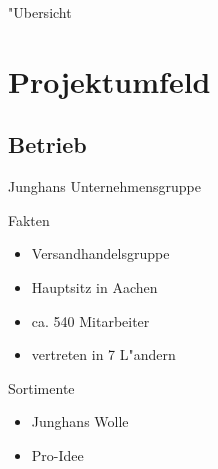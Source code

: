 \AtBeginSection{\frame{\sectionpage}}

\date{\today}

\frenchspacing



\setcounter{framenumber}{0} 
\begin{frame}
  \maketitle
\end{frame}

\setcounter{figure}{0}

\begin{frame}{"Ubersicht}
  \tableofcontents
\end{frame}

\section{Projektumfeld}

\subsection{Betrieb}
\begin{frame}[<+->]{Junghans Unternehmensgruppe}
			\begin{block}{Fakten}
				\begin{itemize}[<+->]
						\item Versandhandelsgruppe
						\item Hauptsitz in Aachen
						\item ca. 540 Mitarbeiter
						\item vertreten in 7 L"andern
				\end{itemize}
			\end{block}

			\begin{block}{Sortimente}
				\begin{itemize}[<+->]
						\item Junghans Wolle
						\item Pro-Idee
				\end{itemize}
			\end{block}
\end{frame}

